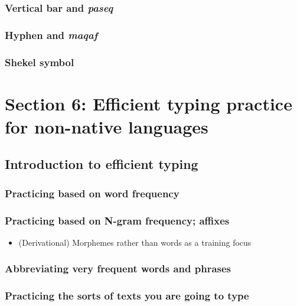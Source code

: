\documentclass[11pt]{article}
\begin{document}
\subsubsection{Vertical bar and \emph{paseq}}
\label{sec:org2af560b}

\subsubsection{Hyphen and \emph{maqaf}}
\label{sec:org70e3768}

\subsubsection{Shekel symbol}
\label{sec:orgadf37c5}

\section{Section 6: Efficient typing practice for non-native languages}
\label{sec:orgc2c05e3}

\subsection{Introduction to efficient typing}
\label{sec:org7cd4206}

\subsubsection{Practicing based on word frequency}
\label{sec:org3de6fb8}

\subsubsection{Practicing based on N-gram frequency; affixes}
\label{sec:orgd8dc58c}

\begin{itemize}
\item (Derivational) Morphemes rather than words as a training focus
\end{itemize}

\subsubsection{Abbreviating very frequent words and phrases}
\label{sec:orge0973d7}

\subsubsection{Practicing the sorts of texts you are going to type}
\label{sec:org1331404}
\end{document}
